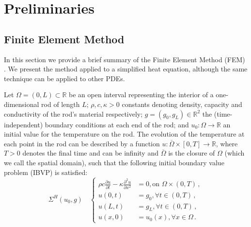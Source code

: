 \documentclass[letterpaper, 10 pt, conference]{ieeeconf/ieeeconf}
\newcommand*{\R}{\mathbb{R}}
\begin{document}
\section{Preliminaries}
\label{sec:preliminaries}

\subsection{Finite Element Method}
\label{sec:heat_equation_and_finite_element_analysis}

In this section we provide a brief summary of the Finite Element Method (FEM)
\cite{hughes_finite_2000}.
We present the method applied
to a simplified heat equation, although the same technique can be applied to other
PDEs. 

Let $\Omega = (0, L) \subset \R$ be an open interval representing the interior
of a one-dimensional rod of length $L$; $\rho, c, \kappa > 0$ 
constants denoting density, capacity and conductivity of the rod's material respectively;
$g = (g_0, g_L) \in \R^2$ the (time-independent) boundary conditions at each end of the rod; and $u_0 :
\Omega \rightarrow \R$ an initial value for the temperature on the rod. 
The evolution of the temperature at
each point in the rod can be described by a function $u : \bar \Omega \times [0,
T] \rightarrow \R$, where $T > 0$ denotes the final time and can be infinity and
$\bar \Omega$ is the closure of $\Omega$ (which we call the spatial domain),
such that the following initial boundary value problem (IBVP) is satisfied:
%
\begin{equation}\label{eq:pde}
    \Sigma^{H}(u_0, g) \quad \left \{
    \begin{aligned}
        \rho c \frac{\partial u}{\partial t} - \kappa \frac{\partial^2
        u}{\partial x^2} &= 0, \text{on } \Omega \times (0, T) \,, \\
        u(0, t) &= g_0, \forall t \in (0, T) \,, \\
        u(L, t) &= g_L, \forall t \in (0, T) \,, \\
        u(x, 0) &= u_0(x), \forall x \in \Omega \,.
    \end{aligned}
    \right.
\end{equation}
\end{document}
